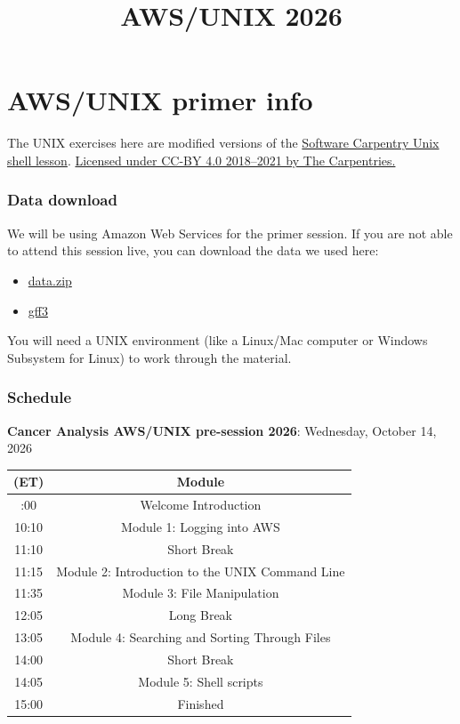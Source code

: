 \documentclass[
]{book}
\title{AWS/UNIX 2026}
\author{}
\date{\vspace{-2.5em}}
\providecommand{\tightlist}{%
  \setlength{\itemsep}{0pt}\setlength{\parskip}{0pt}}
\begin{document}
\maketitle

{
\setcounter{tocdepth}{1}
\tableofcontents
}
\chapter{AWS/UNIX primer info}\label{awsunix-primer-info}

The UNIX exercises here are modified versions of the \href{https://swcarpentry.github.io/shell-novice/}{Software Carpentry Unix shell lesson}. \href{https://carpentries.org/}{Licensed under CC-BY 4.0 2018--2021 by The Carpentries.}

\subsection{Data download}\label{data-download}

We will be using Amazon Web Services for the primer session. If you are not able to attend this session live, you can download the data we used here:

\begin{itemize}
\tightlist
\item
  \href{https://drive.google.com/file/d/1Rckn6rUl9Tv1XnUcG7MvcAztqhqqCIs-/view?usp=drive_link}{data.zip}
\item
  \href{https://drive.google.com/file/d/1GX4LZlIkXiRQqOZD6Tq30eErSZ3Dgd6n/view?usp=drive_link}{gff3}
\end{itemize}

You will need a UNIX environment (like a Linux/Mac computer or Windows Subsystem for Linux) to work through the material.

\subsection{Schedule}\label{schedule}

\textbf{Cancer Analysis AWS/UNIX pre-session 2026}: Wednesday, October 14, 2026

\begin{longtable}[]{@{}cc@{}}
\toprule\noalign{}
(ET) & Module \\
\midrule\noalign{}
\endhead
\bottomrule\noalign{}
\endlastfoot
10:00 & Welcome Introduction \\
10:10 & Module 1: Logging into AWS \\
11:10 & Short Break \\
11:15 & Module 2: Introduction to the UNIX Command Line \\
11:35 & Module 3: File Manipulation \\
12:05 & Long Break \\
13:05 & Module 4: Searching and Sorting Through Files \\
14:00 & Short Break \\
14:05 & Module 5: Shell scripts \\
15:00 & Finished \\
\end{longtable}
\end{document}

